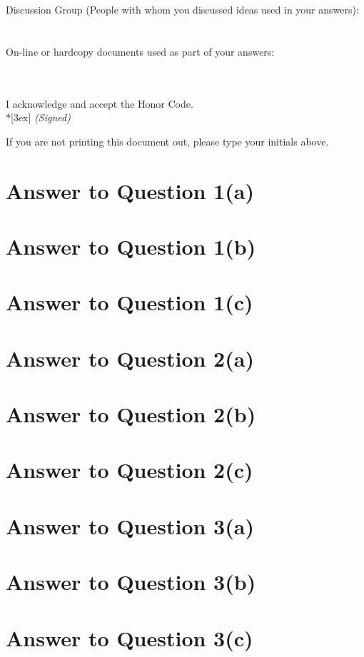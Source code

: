 \documentclass[11pt]{article}
\begin{document}
\vfill
\vfill

Discussion Group (People with whom you discussed ideas used in your answers): \\\\\\
On-line or hardcopy documents used as part of your answers: \\\\\\
\vfill

\vfill

I acknowledge and accept the Honor Code.\\*[3ex]
\bigskip
\textit{(Signed)}\hrulefill

If you are not printing this document out, please type your initials above.

\vfill
\vfill

\pagebreak[4]
\section*{Answer to Question 1(a)}

\section*{Answer to Question 1(b)}

\section*{Answer to Question 1(c)}

\section*{Answer to Question 2(a)}

\section*{Answer to Question 2(b)}

\section*{Answer to Question 2(c)}

\section*{Answer to Question 3(a)}

\section*{Answer to Question 3(b)}

\section*{Answer to Question 3(c)}
\end{document}
